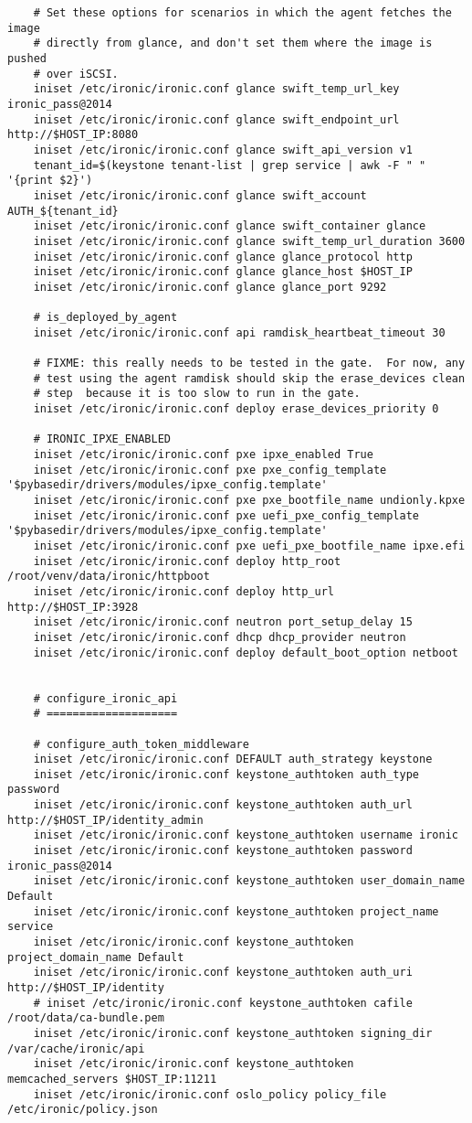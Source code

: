 \documentclass[a4paper,left=2.5cm,right=2.5cm,11pt]{article}
\begin{document}
\begin{lstlisting}
	# Set these options for scenarios in which the agent fetches the image
    # directly from glance, and don't set them where the image is pushed
    # over iSCSI.
	iniset /etc/ironic/ironic.conf glance swift_temp_url_key ironic_pass@2014
    iniset /etc/ironic/ironic.conf glance swift_endpoint_url http://$HOST_IP:8080
    iniset /etc/ironic/ironic.conf glance swift_api_version v1
	tenant_id=$(keystone tenant-list | grep service | awk -F " " '{print $2}')
	iniset /etc/ironic/ironic.conf glance swift_account AUTH_${tenant_id}
    iniset /etc/ironic/ironic.conf glance swift_container glance
    iniset /etc/ironic/ironic.conf glance swift_temp_url_duration 3600
    iniset /etc/ironic/ironic.conf glance glance_protocol http
    iniset /etc/ironic/ironic.conf glance glance_host $HOST_IP
    iniset /etc/ironic/ironic.conf glance glance_port 9292

	# is_deployed_by_agent
	iniset /etc/ironic/ironic.conf api ramdisk_heartbeat_timeout 30

	# FIXME: this really needs to be tested in the gate.  For now, any
    # test using the agent ramdisk should skip the erase_devices clean
    # step  because it is too slow to run in the gate.
	iniset /etc/ironic/ironic.conf deploy erase_devices_priority 0

	# IRONIC_IPXE_ENABLED
	iniset /etc/ironic/ironic.conf pxe ipxe_enabled True
    iniset /etc/ironic/ironic.conf pxe pxe_config_template '$pybasedir/drivers/modules/ipxe_config.template'
    iniset /etc/ironic/ironic.conf pxe pxe_bootfile_name undionly.kpxe
    iniset /etc/ironic/ironic.conf pxe uefi_pxe_config_template '$pybasedir/drivers/modules/ipxe_config.template'
    iniset /etc/ironic/ironic.conf pxe uefi_pxe_bootfile_name ipxe.efi
    iniset /etc/ironic/ironic.conf deploy http_root /root/venv/data/ironic/httpboot
    iniset /etc/ironic/ironic.conf deploy http_url http://$HOST_IP:3928
	iniset /etc/ironic/ironic.conf neutron port_setup_delay 15
	iniset /etc/ironic/ironic.conf dhcp dhcp_provider neutron
    iniset /etc/ironic/ironic.conf deploy default_boot_option netboot


	# configure_ironic_api
	# ====================

	# configure_auth_token_middleware
	iniset /etc/ironic/ironic.conf DEFAULT auth_strategy keystone
	iniset /etc/ironic/ironic.conf keystone_authtoken auth_type password
    iniset /etc/ironic/ironic.conf keystone_authtoken auth_url http://$HOST_IP/identity_admin
    iniset /etc/ironic/ironic.conf keystone_authtoken username ironic
    iniset /etc/ironic/ironic.conf keystone_authtoken password ironic_pass@2014
    iniset /etc/ironic/ironic.conf keystone_authtoken user_domain_name Default
    iniset /etc/ironic/ironic.conf keystone_authtoken project_name service
    iniset /etc/ironic/ironic.conf keystone_authtoken project_domain_name Default
    iniset /etc/ironic/ironic.conf keystone_authtoken auth_uri http://$HOST_IP/identity
    # iniset /etc/ironic/ironic.conf keystone_authtoken cafile /root/data/ca-bundle.pem
    iniset /etc/ironic/ironic.conf keystone_authtoken signing_dir /var/cache/ironic/api
    iniset /etc/ironic/ironic.conf keystone_authtoken memcached_servers $HOST_IP:11211
    iniset /etc/ironic/ironic.conf oslo_policy policy_file /etc/ironic/policy.json


\end{lstlisting}
\end{document}
